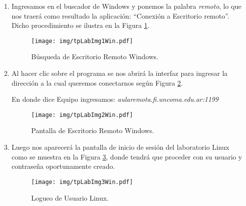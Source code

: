 \documentclass[12pt]{article}
\begin{document}
\begin{enumerate}

\item Ingresamos en el buscador de Windows y ponemos la palabra \emph{remoto}, lo que nos traerá como resultado la aplicación: “Conexión a Escritorio remoto”. Dicho procedimiento se ilustra en la Figura \ref{busquedaWindows}. 

\begin{figure}[!hb]

    \centering

    \texttt{[image: img/tpLabImg1Win.pdf]}

    \caption{Búsqueda de Escritorio Remoto Windows.}

    \label{busquedaWindows}

\end{figure}

\item Al hacer clic sobre el programa se nos abrirá la interfaz para ingresar
    la dirección a la cual queremos conectarnos según Figura \ref{escRemoto}.

    En donde dice Equipo ingresamos: \emph{\mbox{aularemota.fi.uncoma.edu.ar:1199}}

\begin{figure}[!hb]

    \centering

    \texttt{[image: img/tpLabImg2Win.pdf]}

    \caption{Pantalla de Escritorio Remoto Windows.}

    \label{escRemoto}

\end{figure}


\item Luego nos aparecerá la pantalla de inicio de sesión del laboratorio
    Linux como se muestra en la Figura \ref{logueoLinux}, donde tendrá que
        proceder con su usuario y contraseña oportunamente creado.

\begin{figure}[!htb]

    \centering

    \texttt{[image: img/tpLabImg3Win.pdf]}

    \caption{Logueo de Usuario Linux.}

    \label{logueoLinux}

\end{figure}


\end{enumerate}
\end{document}
